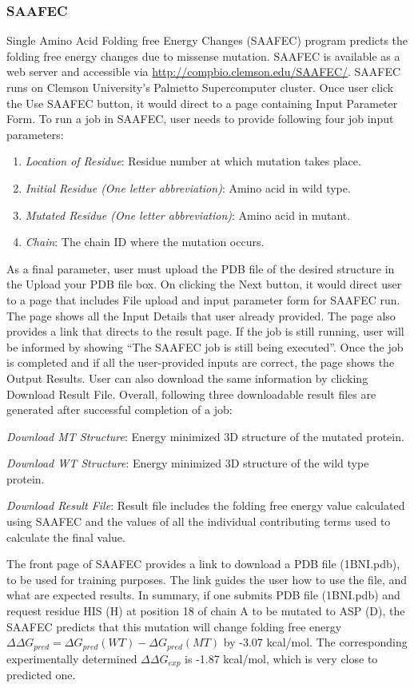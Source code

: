 \documentclass[9pt,tutorial,pubversion]{livecoms}
\begin{document}
\subsubsection{SAAFEC} Single Amino Acid Folding free Energy Changes (SAAFEC) program\cite{getov2016saafec} predicts the folding free energy changes due to missense mutation. SAAFEC is available as a web server and accessible via \url{http://compbio.clemson.edu/SAAFEC/}. SAAFEC runs on Clemson University’s Palmetto Supercomputer cluster. Once user click the Use SAAFEC button, it would direct to a page containing Input Parameter Form. To run a job in SAAFEC, user needs to provide following four job input parameters:
\begin{enumerate}
\item \textit{Location of Residue}: Residue number at which mutation takes place.
\item \textit{Initial Residue (One letter abbreviation)}: Amino acid in wild type.
\item \textit{Mutated Residue (One letter abbreviation)}: Amino acid in mutant. 
\item \textit{Chain}: The chain ID where the mutation occurs.
\end{enumerate}
As a final parameter, user must upload the PDB file of the desired structure in the Upload your PDB file box. On clicking the Next button, it would direct user to a page that includes File upload and input parameter form for SAAFEC run. The page shows all the Input Details that user already provided. The page also provides a link that directs to the result page. If the job is still running, user will be informed by showing ``The SAAFEC job is still being executed''. Once the job is completed and if all the user-provided inputs are correct, the page shows the Output Results. User can also download the same information by clicking Download Result File. Overall, following three downloadable result files are generated after successful completion of a job:

\textit{Download MT Structure}: Energy minimized 3D structure of the mutated protein.
	
\textit{Download WT Structure}: Energy minimized 3D structure of the wild type protein.

\textit{Download Result File}: Result file includes the folding free energy value calculated using SAAFEC and the values of all the individual contributing terms used to calculate the final value. 


The front page of SAAFEC provides a link to download a PDB file (1BNI.pdb), to be used for training purposes. The link guides the user how to use the file, and what are expected results. In summary, if one submits PDB file (1BNI.pdb) and request residue  HIS (H) at position 18 of chain A to be mutated to ASP (D), the SAAFEC predicts that this mutation will change folding free energy $ \Delta\Delta G_{pred} = \Delta G_{pred}(WT) - \Delta G_{pred}(MT) $ by -3.07 kcal/mol. The corresponding experimentally determined $ \Delta\Delta G_{exp} $ is  -1.87 kcal/mol, which is very close to predicted one.
\end{document}

